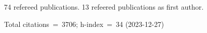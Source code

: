 74 refereed publications. 13 refeered publications as first author.

Total citations~=~3706; h-index~=~34 (2023-12-27)